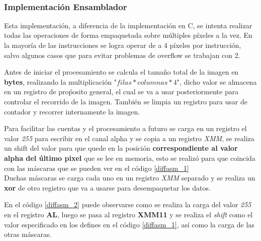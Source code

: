 ~
~

\subsubsection{Implementaci\'on Ensamblador}
\label{sec:diff_impasm}
Esta implementaci\'on, a diferencia de la implementaci\'on en C, se intenta realizar todas las operaciones de forma empaquetada sobre m\'ultiples p\'ixeles a la vez. En la mayor\'ia de las instrucciones se logra operar de a 4 p\'ixeles por instrucci\'on, salvo algunos casos que para evitar problemas de overflow se trabajan con 2.

Antes de iniciar el procesamiento se calcula el tama\~no total de la imagen en \textbf{bytes}, realizando la multiplicaci\'on 
"$filas * columnas * 4$", dicho valor se almacena en un registro de pro\'posito general, el cual se va a usar posteriormente para controlar el recorrido de la imagen. Tambi\'en se limpia un registro para usar de contador y recorrer internamente la imagen.

Para facilitar las cuentas y el procesamiento a futuro se carga en un registro el valor \emph{255} para escribir en el canal alpha y se copia a un registro \emph{XMM}, se realiza un shift del valor para que quede en la posición \textbf{correspondiente al valor alpha del \'ultimo pixel} que se lee en memoria, esto se realiz\'o para que coincida con las m\'ascaras que se pueden ver en el c\'odigo \ref{diffasm_1} \\ 
Duchas m\'ascaras se carga cada uno en un registro \emph{XMM} separado y se realiza un \textbf{xor} de otro registro que va a usarse para desempaquetar los datos.

En el c\'odigo \ref{diffasm_2} puede observarse como se realiza la carga del valor \emph{255} en el registro \textbf{AL}, luego se pasa al registro \textbf{XMM11} y se realiza el \emph{shift} como el valor especificado en los defines en el c\'odigo \ref{diffasm_1}, as\'i como la carga de las  otras m\'ascaras. \\


